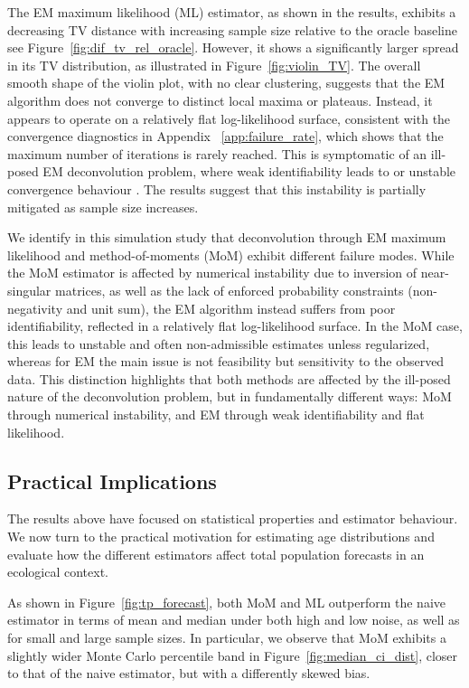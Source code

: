 \documentclass[11pt,a4paper]{article}
\begin{document}
The EM maximum likelihood (ML) estimator, as shown in the results, exhibits a decreasing TV distance with increasing sample size relative to the oracle baseline see Figure~\ref{fig:dif_tv_rel_oracle}. However, it shows a significantly larger spread in its TV distribution, as illustrated in Figure~\ref{fig:violin_TV}. The overall smooth shape of the violin plot, with no clear clustering, suggests that the EM algorithm does not converge to distinct local maxima or plateaus. Instead, it appears to operate on a relatively flat log-likelihood surface, consistent with the convergence diagnostics in Appendix~ \ref{app:failure_rate}, which shows that the maximum number of iterations is rarely reached. This is symptomatic of an ill-posed EM deconvolution problem, where weak identifiability leads to or unstable convergence behaviour \parencites[p.~28]{mclachlan2008}. The results suggest that this instability is partially mitigated as sample size increases.

We identify in this simulation study that deconvolution through EM maximum likelihood and method-of-moments (MoM) exhibit different failure modes. While the MoM estimator is affected by numerical instability due to inversion of near-singular matrices, as well as the lack of enforced probability constraints (non-negativity and unit sum), the EM algorithm instead suffers from poor identifiability, reflected in a relatively flat log-likelihood surface. In the MoM case, this leads to unstable and often non-admissible estimates unless regularized, whereas for EM the main issue is not feasibility but sensitivity to the observed data. This distinction highlights that both methods are affected by the ill-posed nature of the deconvolution problem, but in fundamentally different ways: MoM through numerical instability, and EM through weak identifiability and flat likelihood.

\subsection{Practical Implications}

The results above have focused on statistical properties and estimator behaviour. We now turn to the practical motivation for estimating age distributions and evaluate how the different estimators affect total population forecasts in an ecological context.

As shown in Figure~\ref{fig:tp_forecast}, both MoM and ML outperform the naive estimator in terms of mean and median under both high and low noise, as well as for small and large sample sizes. In particular, we observe that MoM exhibits a slightly wider Monte Carlo percentile band in Figure~\ref{fig:median_ci_dist}, closer to that of the naive estimator, but with a differently skewed bias.
\end{document}
